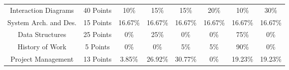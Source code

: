 {\begin{figure}
\begin{centering}
\begin{tabular}{cc|c|c|c|c|c|c|}
\multicolumn{1}{|c|}{Interaction Diagrams} & \multicolumn{1}{c|}{40 Points} & 
10\% & 15\% & 15\% & 20\% & 10\% & 30\% \\ \cline{1-8}
\multicolumn{1}{|c|}{System Arch. and Des.} & \multicolumn{1}{c|}{15 Points} & 
16.67\% & 16.67\% & 16.67\% & 16.67\% & 16.67\% & 16.67\% \\ \cline{1-8}
\multicolumn{1}{|c|}{Data Structures} & \multicolumn{1}{c|}{25 Points} & 
0\% & 25\% & 0\% & 0\% & 75\% & 0\% \\ \cline{1-8}
\multicolumn{1}{|c|}{History of Work} & \multicolumn{1}{c|}{5 Points} & 
0\% & 0\% & 5\% & 5\% & 90\% & 0\% \\ \cline{1-8}
\multicolumn{1}{|c|}{Project Management} & \multicolumn{1}{c|}{13 Points} & 
3.85\% & 26.92\% & 30.77\% & 0\% & 19.23\% & 19.23\% \\ \cline{1-8}

\end{tabular}
\end{centering}
\end{figure}
}